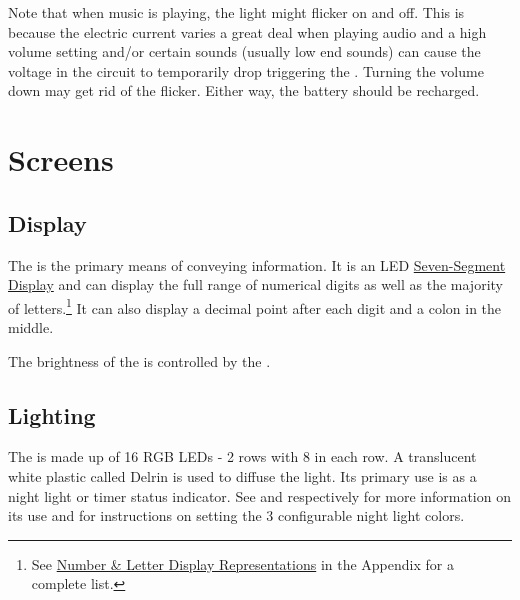Note that when music is playing, the light might flicker on and off. This is
because the electric current varies a great deal when playing audio and a high
volume setting and/or certain sounds (usually low end sounds) can cause the
voltage in the circuit to temporarily drop triggering the .  Turning
the volume down may get rid of the flicker.  Either way, the battery should
be recharged.

\section{Screens}

\subsection{Display} \label{Display}

The  is the primary means of conveying information.  It is an LED
\href{https://en.wikipedia.org/wiki/Seven-segment\_display}{Seven-Segment Display}
and can display the full range of numerical digits as well as the majority of
letters.\footnote{ See \hyperref[Display Digits]{Number \& Letter Display Representations}
in the Appendix for a complete list.}  It can also display a decimal point after
each digit and a colon in the middle.

\par\medskip

The brightness of the  is controlled by the
\hyperref[Brightness Knob]{}.

\subsection{Lighting} \label{Lighting}

The  is made up of \num{16} RGB LEDs - 2 rows with \num{8} in each row.
A translucent white plastic called Delrin is used to diffuse the light.  Its
primary use is as a night light or timer status indicator.
See \hyperref[Clock]{} and \hyperref[Timer]{} respectively for
more information on its use and \hyperref[Set Night Light]{} for
instructions on setting the \num{3} configurable night light colors.

